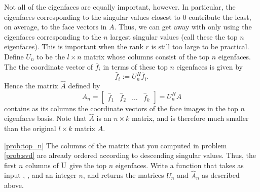 Not all of the eigenfaces are equally important, however.
In particular, the eigenfaces corresponding to the singular values closest to 0 contribute the least, on average, to the face vectors in $A$.
Thus, we can get away with only using the eigenfaces corresponding to the $n$ largest singular values (call these the top $n$ eigenfaces).
This is important when the rank $r$ is still too large to be practical.
Define $U_n$ to be the $l \times n$ matrix whose columns consist of the top $n$ eigenfaces.
The the coordinate vector of $\bar{f}_i$ in terms of these top $n$ eigenfaces is given by
\[
\hat{f}_i := U_n^H\bar{f}_i.
\]
Hence the matrix $\hat{A}$ defined by
\[
\hat{A}_n = \begin{bmatrix}
\hat{f}_1 & \hat{f}_2 & \ldots & \hat{f}_k
\end{bmatrix}
= U_n^HA
\]
contains as its columns the coordinate vectors of the face images in the top $n$ eigenfaces basis.
Note that $\hat{A}$ is an $n \times k$ matrix, and is therefore much smaller than the original $l \times k$ matrix $A$.
\begin{problem}
\ref{prob:top_n}
The columns of the matrix  that you computed in problem \ref{prob:svd} are already ordered according to descending singular values.
Thus, the first $n$ columns of $\li{U}$ give the top $n$ eigenfaces.
Write a function that takes as input , , and an integer $n$, and returns the matrices $U_n$ and $\hat{A}_n$ as described above.
\end{problem}

